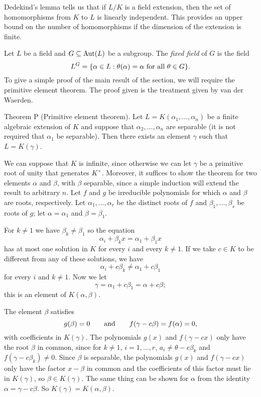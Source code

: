 Dedekind's lemma tells us that if $L/K$ is a field extension, then the set of homomorphisms from $K$ to $L$ is linearly independent. This provides an upper bound on the number of homomorphisms if the dimension of the extension is finite.

Let $L$ be a field and $G\subseteq \mathop {\rm Aut}(L)$ be a subgroup. The {\it fixed field} of $G$ is the field
$$L^G = \{\alpha\in L : \theta(\alpha) = \alpha\ \hbox{for all}\ \theta\in G\}.$$
To give a simple proof of the main result of the section, we will require the primitive element theorem. The proof given is the treatment given by van der Waerden.

\parenproclaim Theorem P (Primitive element theorem). Let $L = K(\alpha_1,\ldots,\alpha_n)$ be a finite algebraic extension of $K$ and suppose that $\alpha_2,\ldots,\alpha_n$ are separable (it is not required that $\alpha_1$ be separable). Then there exists an element $\gamma$ such that $L = K(\gamma)$.

\proof We can suppose that $K$ is infinite, since otherwise we can let $\gamma$ be a primitive root of unity that generates $K^\times$. Moreover, it suffices to show the theorem for two elements $\alpha$ and $\beta$, with $\beta$ separable, since a simple induction will extend the result to arbitrary $n$. Let $f$ and $g$ be irreducible polynomials for which $\alpha$ and $\beta$ are roots, respectively. Let $\alpha_1,\ldots,\alpha_r$ be the distinct roots of $f$ and $\beta_1,\ldots,\beta_s$ be roots of $g$; let $\alpha =\alpha_1$ and $\beta = \beta_1$.

For $k\neq 1$ we have $\beta_k\neq \beta_1$ so the equation
$$\alpha_i + \beta_k x = \alpha_1 + \beta_1x$$
has at most one solution in $K$ for every $i$ and every $k\neq 1$. If we take $c\in K$ to be different from any of these solutions, we have
$$\alpha_i + c\beta_k \neq \alpha_1 + c\beta_1$$
for every $i$ and $k\neq 1$. Now we let
$$\gamma = \alpha_1 + c\beta_1 = \alpha + c\beta;$$
this is an element of $K(\alpha,\beta)$.

The element $\beta$ satisfies
$$g(\beta) = 0\qquad\hbox{and}\qquad f(\gamma - c\beta) = f(\alpha) = 0,$$
with coefficients in $K(\gamma)$. The polynomials $g(x)$ and $f(\gamma - cx)$ only have the root $\beta$ in common, since for $k\neq 1$, $i = 1,\ldots,r$, $a_i \neq \theta - c\beta_k$ and $f(\gamma - c\beta_k) \neq 0$. Since $\beta$ is separable, the polynomials $g(x)$ and $f(\gamma - cx)$ only have the factor $x-\beta$ in common and the coefficients of this factor must lie in $K(\gamma)$, so $\beta\in K(\gamma)$. The same thing can be shown for $\alpha$ from the identity $\alpha = \gamma - c\beta$. So $K(\gamma) = K(\alpha,\beta)$.\slug

